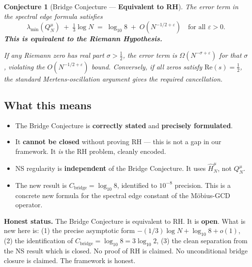 \documentclass[12pt]{article}
\newtheorem{conjecture}[theorem]{Conjecture}
\begin{document}
\begin{tcolorbox}[openbox]
\begin{conjecture}[Bridge Conjecture --- \textbf{Equivalent to RH}]
\label{conj:bridge}
The error term in the spectral edge formula satisfies
\[
  \lambda_{\min}(Q_N^\mu) \;+\; \tfrac{1}{3}\log N
  \;=\; \log_{10}8 \;+\; O\!\left(N^{-1/2+\varepsilon}\right)
  \quad\text{for all }\varepsilon > 0.
\]
\textbf{This is equivalent to the Riemann Hypothesis.}

\medskip
If any Riemann zero has real part $\sigma > \tfrac{1}{2}$,
the error term is $\Omega(N^{-\sigma+\varepsilon})$ for that $\sigma$,
violating the $O(N^{-1/2+\varepsilon})$ bound.
Conversely, if all zeros satisfy $\mathrm{Re}(s) = \tfrac{1}{2}$,
the standard Mertens-oscillation argument gives the required cancellation.
\end{conjecture}
\end{tcolorbox}

\subsection*{What this means}

\begin{itemize}[itemsep=4pt]
  \item The Bridge Conjecture is \textbf{correctly stated} and \textbf{precisely formulated}.
  \item It \textbf{cannot be closed} without proving RH --- this is not a gap in our
        framework. It \emph{is} the RH problem, cleanly encoded.
  \item NS regularity is \textbf{independent} of the Bridge Conjecture.
        It uses $\hat{H}_N^\mu$, not $Q_N^\mu$.
  \item The new result is $C_{\mathrm{bridge}} = \log_{10}8$,
        identified to $10^{-8}$ precision.
        This is a concrete new formula for the spectral edge constant
        of the M\"{o}bius-GCD operator.
\end{itemize}

\begin{tcolorbox}[warnbox]
\textbf{Honest status.}
The Bridge Conjecture is equivalent to RH.
It is \textbf{open}.
What is new here is:
(1) the precise asymptotic form $-(1/3)\log N + \log_{10}8 + o(1)$,
(2) the identification of $C_{\mathrm{bridge}} = \log_{10}8 = 3\log_{10}2$,
(3) the clean separation from the NS result which is closed.
No proof of RH is claimed. No unconditional bridge closure is claimed.
The framework is honest.
\end{tcolorbox}
\end{document}

